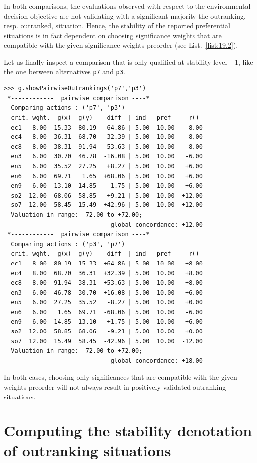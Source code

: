 In both comparisons, the evaluations observed with respect to the environmental decision objective are not validating with a significant majority the outranking, resp. outranked, situation. Hence, the stability of the reported preferential situations is in fact dependent on choosing significance weights that are compatible with the given significance weights preorder (see List.~\vref{list:19.2}).

Let us finally inspect a comparison that is only qualified at stability level $+1$, like the one between alternatives \texttt{p7} and \texttt{p3}.
\begin{lstlisting}[caption={Comparison of alternatives \texttt{p7} and \texttt{p3}},label=list:19.6]
>>> g.showPairwiseOutrankings('p7','p3')
 *------------  pairwise comparison ----*
  Comparing actions : ('p7', 'p3')
  crit. wght.  g(x)  g(y)    diff  | ind   pref     r()
  ec1   8.00  15.33  80.19  -64.86 | 5.00  10.00   -8.00
  ec4   8.00  36.31  68.70  -32.39 | 5.00  10.00   -8.00
  ec8   8.00  38.31  91.94  -53.63 | 5.00  10.00   -8.00
  en3   6.00  30.70  46.78  -16.08 | 5.00  10.00   -6.00
  en5   6.00  35.52  27.25   +8.27 | 5.00  10.00   +6.00
  en6   6.00  69.71   1.65  +68.06 | 5.00  10.00   +6.00
  en9   6.00  13.10  14.85   -1.75 | 5.00  10.00   +6.00
  so2  12.00  68.06  58.85   +9.21 | 5.00  10.00  +12.00
  so7  12.00  58.45  15.49  +42.96 | 5.00  10.00  +12.00
  Valuation in range: -72.00 to +72.00;          -------
                              global concordance: +12.00
 *------------  pairwise comparison ----*
  Comparing actions : ('p3', 'p7')
  crit. wght.  g(x)  g(y)    diff  | ind   pref     r()
  ec1   8.00  80.19  15.33  +64.86 | 5.00  10.00   +8.00
  ec4   8.00  68.70  36.31  +32.39 | 5.00  10.00   +8.00
  ec8   8.00  91.94  38.31  +53.63 | 5.00  10.00   +8.00
  en3   6.00  46.78  30.70  +16.08 | 5.00  10.00   +6.00
  en5   6.00  27.25  35.52   -8.27 | 5.00  10.00   +0.00
  en6   6.00   1.65  69.71  -68.06 | 5.00  10.00   -6.00
  en9   6.00  14.85  13.10   +1.75 | 5.00  10.00   +6.00
  so2  12.00  58.85  68.06   -9.21 | 5.00  10.00   +0.00
  so7  12.00  15.49  58.45  -42.96 | 5.00  10.00  -12.00
  Valuation in range: -72.00 to +72.00;          -------
                              global concordance: +18.00
\end{lstlisting}

In both cases, choosing only significances that are compatible with the given weights preorder will not always result in positively validated outranking situations.

\section{Computing the stability denotation of outranking situations}
\label{sec:19.3}

